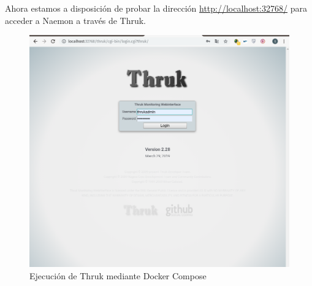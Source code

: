 Ahora estamos a disposición de probar la dirección \url{http://localhost:32768/} para acceder a Naemon a través de Thruk.

\begin{figure}[H]
	\centering
		\includegraphics[width=1\textwidth]{imagenes/despliegue_naemon/pantallaDockerNaemon.png}
	\caption{Ejecución de Thruk mediante Docker Compose} \label{dockercomposethruk}
\end{figure}
\newpage